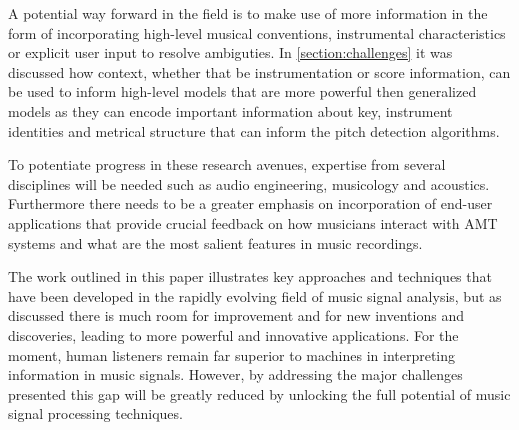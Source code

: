A potential way forward in the field is to make use of more information in the
form of incorporating high-level musical conventions, instrumental
characteristics or explicit user input to resolve ambiguties. In
\autoref{section:challenges} it was discussed how context, whether that be
instrumentation or score information, can be used to inform high-level models
that are more powerful then generalized models as they can encode important
information about key, instrument identities and metrical structure that can
inform the pitch detection algorithms.

To potentiate progress in these research avenues, expertise from several
disciplines will be needed such as audio engineering, musicology and acoustics.
Furthermore there needs to be a greater emphasis on incorporation of end-user
applications that provide crucial feedback on how musicians interact with AMT
systems and what are the most salient features in music recordings.

The work outlined in this paper illustrates key approaches and techniques that
have been developed in the rapidly evolving field of music signal analysis, but
as discussed there is much room for improvement and for new inventions and
discoveries, leading to more powerful and innovative applications. For the
moment, human listeners remain far superior to machines in interpreting
information in music signals. However, by addressing the major challenges
presented this gap will be greatly reduced by unlocking the full potential of
music signal processing techniques.

